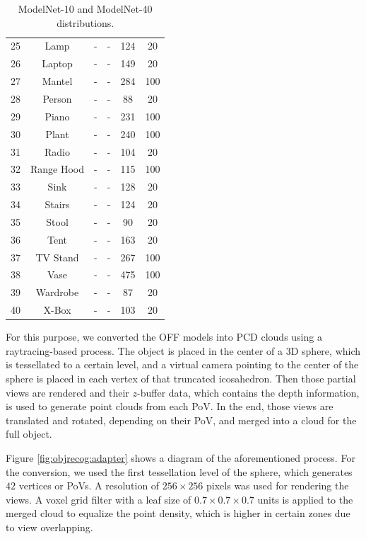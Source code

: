 \begin{table}
\begin{tabular}{rccccc}
    25 & Lamp	  & -	 & -	 & 124	& 20 \\
    26 & Laptop	  & -	 & -	 & 149	& 20 \\
    27 & Mantel	  & -	 & -	 & 284	& 100 \\
    28 & Person	  & -	 & -	 & 88	& 20 \\
    29 & Piano	  & -	 & -	 & 231	& 100 \\
    30 & Plant	  & -	 & -	 & 240	& 100 \\
    31 & Radio	  & -	 & -	 & 104  & 20 \\
    32 & Range Hood & -	 & -	 & 115	& 100 \\
    33 & Sink	  & -	 & -	 & 128	& 20 \\
    34 & Stairs 	 & -	 & -	 & 124	& 20 \\
    35 & Stool 	 & -	 & -	 & 90	& 20 \\
    36 & Tent  	 & -	 & -	 & 163	& 20 \\
    37 & TV Stand  & -	 & -	 & 267	& 100 \\
    38 & Vase	 & -	 & -	 & 475	& 100 \\
    39 & Wardrobe  & -	 & -	 & 87	& 20 \\
    40 & X-Box	 & -	 & -	& 103	& 20 \\
    \bottomrule
    \end{tabular}
    \caption{ModelNet-10 and ModelNet-40 distributions.}
    \label{table:objrecog:modelnet_distribution}
\end{table}

\clearpage

For this purpose, we converted the \ac{OFF} models into \ac{PCD} clouds using a raytracing-based process. The object is placed in the center of a \acs{3D} sphere, which is tessellated to a certain level, and a virtual camera pointing to the center of the sphere is placed in each vertex of that truncated icosahedron. Then those partial views are rendered and their $z$-buffer data, which contains the depth information, is used to generate point clouds from each \acs{PoV}. In the end, those views are translated and rotated, depending on their \ac{PoV}, and merged into a cloud for the full object.

Figure \ref{fig:objrecog:adapter} shows a diagram of the aforementioned process. For the conversion, we used the first tessellation level of the sphere, which generates $42$ vertices or \acp{PoV}. A resolution of $256\times256$ pixels was used for rendering the views. A voxel grid filter with a leaf size of $0.7\times0.7\times0.7$ units is applied to the merged cloud to equalize the point density, which is higher in certain zones due to view overlapping.


